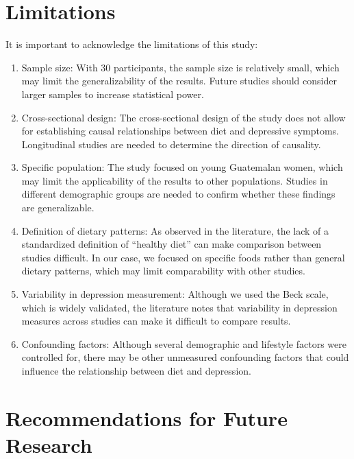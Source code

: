 \documentclass[jou]{apa7}
\begin{document}
\section{Limitations}\label{limitaciones}

It is important to acknowledge the limitations of this study:

\begin{enumerate}
	\item Sample size: With 30 participants, the sample size is relatively small, which may limit the generalizability of the results. Future studies should consider larger samples to increase statistical power.
	\item Cross-sectional design: The cross-sectional design of the study does not allow for establishing causal relationships between diet and depressive symptoms. Longitudinal studies are needed to determine the direction of causality.
	\item Specific population: The study focused on young Guatemalan women, which may limit the applicability of the results to other populations. Studies in different demographic groups are needed to confirm whether these findings are generalizable.
	\item Definition of dietary patterns: As observed in the literature, the lack of a standardized definition of ``healthy diet'' can make comparison between studies difficult. In our case, we focused on specific foods rather than general dietary patterns, which may limit comparability with other studies.
	\item Variability in depression measurement: Although we used the Beck scale, which is widely validated, the literature notes that variability in depression measures across studies can make it difficult to compare results.
	\item Confounding factors: Although several demographic and lifestyle factors were controlled for, there may be other unmeasured confounding factors that could influence the relationship between diet and depression.
\end{enumerate}


\section{Recommendations for Future Research}\label{recomendaciones-para-futuras-investigaciones}
\end{document}
